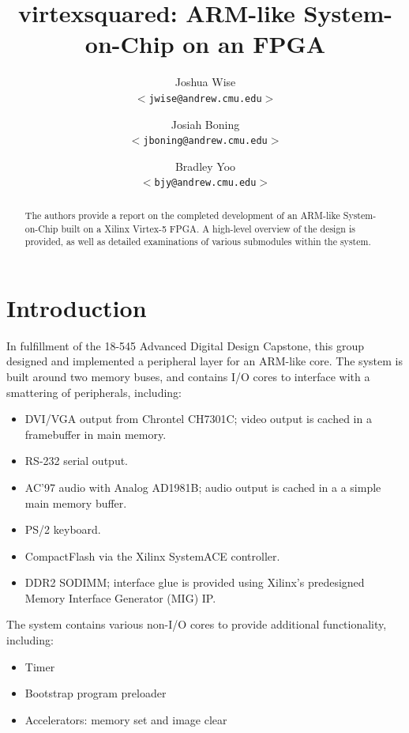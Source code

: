 \documentclass[10pt]{report}
\title{virtexsquared: ARM-like System-on-Chip on an FPGA}
\author{Joshua Wise\\
\texttt{$<$jwise@andrew.cmu.edu$>$} \and
Josiah Boning\\
\texttt{$<$jboning@andrew.cmu.edu$>$} \and
Bradley Yoo\\
\texttt{$<$bjy@andrew.cmu.edu$>$}}
\begin{document}
\maketitle

\begin{abstract}

The authors provide a report on the completed development of an ARM-like
System-on-Chip built on a Xilinx Virtex-5 FPGA.  A high-level overview of
the design is provided, as well as detailed examinations of various
submodules within the system.  

\end{abstract}

\vspace{0.1in} %

\chapter{Introduction}

In fulfillment of the 18-545 Advanced Digital Design Capstone, this group
designed and implemented a peripheral layer for an ARM-like core. 
The system is built around two memory buses, and contains I/O cores to
interface with a smattering of peripherals, including:

\begin{itemize}
\item{DVI/VGA output from Chrontel CH7301C; video output is cached in a
framebuffer in main memory.}
\item{RS-232 serial output.}
\item{AC'97 audio with Analog AD1981B; audio output is cached in a
a simple main memory buffer.}
\item{PS/2 keyboard.}
\item{CompactFlash via the Xilinx SystemACE controller.}
\item{DDR2 SODIMM; interface glue is provided using Xilinx's predesigned
Memory Interface Generator (MIG) IP.}
\end{itemize}

The system contains various non-I/O cores to provide additional functionality,
including:

\begin{itemize}
\item{Timer}
\item{Bootstrap program preloader}
\item{Accelerators: memory set and image clear}
\end{itemize}
\end{document}
